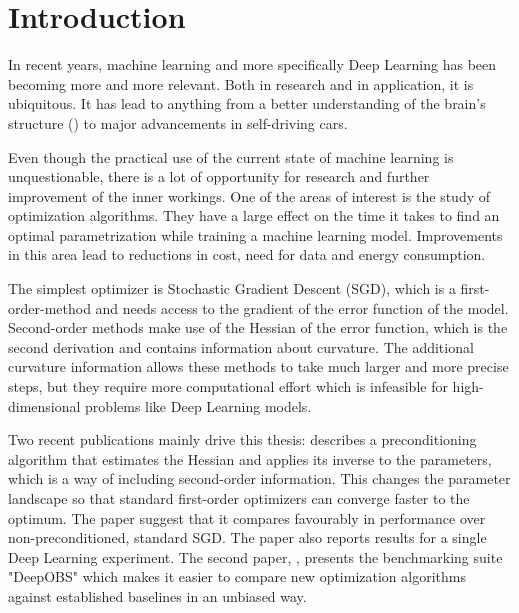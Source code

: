 \documentclass[twoside,12pt,a4paper]{report}
\begin{document}

\renewcommand{\baselinestretch}{1.3}
\small\normalsize

\tableofcontents

\renewcommand{\baselinestretch}{1}
\small\normalsize

\cleardoublepage


\setcounter{page}{1}


\chapter{Introduction} %
In recent years, machine learning and more specifically Deep Learning has been becoming more and more relevant. Both in research and in application, it is ubiquitous. It has lead to anything from a better understanding of the brain's structure (\cite{brown2016machine}) to major advancements in self-driving cars.

Even though the practical use of the current state of machine learning is unquestionable, there is a lot of opportunity for research and further improvement of the inner workings. One of the areas of interest is the study of optimization algorithms. They have a large effect on the time it takes to find an optimal parametrization while training a machine learning model. Improvements in this area lead to reductions in cost, need for data and energy consumption.

The simplest optimizer is Stochastic Gradient Descent (SGD), which is a first-order-method and needs access to the gradient of the error function of the model. Second-order methods make use of the Hessian of the error function, which is the second derivation and contains information about curvature. The additional curvature information allows these methods to take much larger and more precise steps, but they require more computational effort which is infeasible for high-dimensional problems like Deep Learning models.

Two recent publications mainly drive this thesis: \cite{roos2019active} describes a preconditioning algorithm that estimates the Hessian and applies its inverse to the parameters, which is a way of including second-order information. This changes the parameter landscape so that standard first-order optimizers can converge faster to the optimum. The paper suggest that it compares favourably in performance over non-preconditioned, standard SGD. The paper also reports results for a single Deep Learning experiment.
The second paper, \cite{deepobs}, presents the benchmarking suite "DeepOBS" which makes it easier to compare new optimization algorithms against established baselines in an unbiased way.
\end{document}
